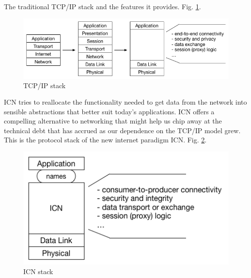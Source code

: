 The traditional TCP/IP stack and the features it provides. Fig. \ref{fig:TCP/IP stack}.
 \begin{figure}[h]
	\centering
	\includegraphics[width=0.8\linewidth]{Figures/tcpstack.png}
	\caption[]{TCP/IP stack}
	\label{fig:TCP/IP stack}
\end{figure}
\par
ICN tries to reallocate the functionality needed to get data from the network into sensible abstractions that better suit today’s applications.
ICN offers a compelling alternative to networking that might help us chip away at the technical debt that has accrued as our dependence on the TCP/IP model grew.
 This is the protocol stack of the new internet paradigm ICN. Fig. \ref{fig:stack}.
 \begin{figure}[h]
	\centering
	\includegraphics[width=0.8\linewidth]{Figures/stack.png}
	\caption[]{ICN stack}
	\label{fig:stack}
\end{figure}

 
